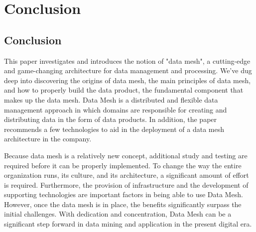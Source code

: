 \documentclass[12pt, a4paper]{book}
\begin{document}
\chapter{Conclusion}
\section{Conclusion}
This paper investigates and introduces the notion of "data mesh", a cutting-edge and game-changing architecture for data management and processing. We've dug deep into discovering the origins of data mesh, the main principles of data mesh, and how to properly build the data product, the fundamental component that makes up the data mesh. Data Mesh is a distributed and flexible data management approach in which domains are responsible for creating and distributing data in the form of data products. In addition, the paper recommends a few technologies to aid in the deployment of a data mesh architecture in the company.

Because data mesh is a relatively new concept, additional study and testing are required before it can be properly implemented. To change the way the entire organization runs, its culture, and its architecture, a significant amount of effort is required. Furthermore, the provision of infrastructure and the development of supporting technologies are important factors in being able to use Data Mesh. However, once the data mesh is in place, the benefits significantly surpass the initial challenges. With dedication and concentration, Data Mesh can be a significant step forward in data mining and application in the present digital era.


\begingroup
\backmatter
{}
\renewcommand\bibname{References}
\endgroup

\clearpage
\end{document}
